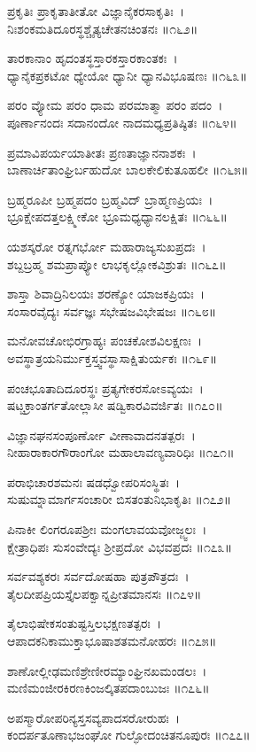 	ಪ್ರಕೃತಿಃ ಪ್ರಾಕೃತಾತೀತೋ ವಿಜ್ಞಾನೈಕರಸಾಕೃತಿಃ~।\\
	ನಿಃಶಂಕಮತಿದೂರಸ್ಥಶ್ಚೈತ್ಯಚೇತನಚಿಂತನಃ ॥೧೬೨॥

ತಾರಕಾನಾಂ ಹೃದಂತಸ್ಥಸ್ತಾರಕಸ್ತಾರಕಾಂತಕಃ~।\\
ಧ್ಯಾನೈಕಪ್ರಕಟೋ ಧ್ಯೇಯೋ ಧ್ಯಾನೀ ಧ್ಯಾನವಿಭೂಷಣಃ ॥೧೬೩॥

	ಪರಂ ವ್ಯೋಮ ಪರಂ ಧಾಮ ಪರಮಾತ್ಮಾ ಪರಂ ಪದಂ~।\\
	ಪೂರ್ಣಾನಂದಃ ಸದಾನಂದೋ ನಾದಮಧ್ಯಪ್ರತಿಷ್ಠಿತಃ ॥೧೬೪॥

ಪ್ರಮಾವಿಪರ್ಯಯಾತೀತಃ ಪ್ರಣತಾಜ್ಞಾನನಾಶಕಃ~।\\
ಬಾಣಾರ್ಚಿತಾಂಘ್ರಿರ್ಬಹುದೋ ಬಾಲಕೇಲಿಕುತೂಹಲೀ ॥೧೬೫॥

	ಬ್ರಹ್ಮರೂಪೀ ಬ್ರಹ್ಮಪದಂ ಬ್ರಹ್ಮವಿದ್ ಬ್ರಾಹ್ಮಣಪ್ರಿಯಃ~।\\
	ಭ್ರೂಕ್ಷೇಪದತ್ತಲಕ್ಷ್ಮೀಕೋ ಭ್ರೂಮಧ್ಯಧ್ಯಾನಲಕ್ಷಿತಃ ॥೧೬೬॥

ಯಶಸ್ಕರೋ ರತ್ನಗರ್ಭೋ ಮಹಾರಾಜ್ಯಸುಖಪ್ರದಃ~।\\
ಶಬ್ದಬ್ರಹ್ಮ ಶಮಪ್ರಾಪ್ಯೋ ಲಾಭಕೃಲ್ಲೋಕವಿಶ್ರುತಃ ॥೧೬೭॥

	ಶಾಸ್ತಾ ಶಿವಾದ್ರಿನಿಲಯಃ ಶರಣ್ಯೋ ಯಾಜಕಪ್ರಿಯಃ~।\\
	ಸಂಸಾರವೈದ್ಯಃ ಸರ್ವಜ್ಞಃ ಸಭೇಷಜವಿಭೇಷಜಃ ॥೧೬೮॥

ಮನೋವಚೋಭಿರಗ್ರಾಹ್ಯಃ ಪಂಚಕೋಶವಿಲಕ್ಷಣಃ~।\\
ಅವಸ್ಥಾತ್ರಯನಿರ್ಮುಕ್ತಸ್ತ್ವವಸ್ಥಾಸಾಕ್ಷಿತುರ್ಯಕಃ ॥೧೬೯॥

	ಪಂಚಭೂತಾದಿದೂರಸ್ಥಃ ಪ್ರತ್ಯಗೇಕರಸೋಽವ್ಯಯಃ~।\\
	ಷಟ್ಚಕ್ರಾಂತರ್ಗತೋಲ್ಲಾಸೀ ಷಡ್ವಿಕಾರವಿವರ್ಜಿತಃ ॥೧೭೦॥

ವಿಜ್ಞಾನಘನಸಂಪೂರ್ಣೋ ವೀಣಾವಾದನತತ್ಪರಃ~।\\
ನೀಹಾರಾಕಾರಗೌರಾಂಗೋ ಮಹಾಲಾವಣ್ಯವಾರಿಧಿಃ ॥೧೭೧॥

	ಪರಾಭಿಚಾರಶಮನಃ ಷಡಧ್ವೋಪರಿಸಂಸ್ಥಿತಃ~।\\
	ಸುಷುಮ್ನಾಮಾರ್ಗಸಂಚಾರೀ ಬಿಸತಂತುನಿಭಾಕೃತಿಃ ॥೧೭೨॥

ಪಿನಾಕೀ ಲಿಂಗರೂಪಶ್ರೀಃ ಮಂಗಲಾವಯವೋಜ್ಜ್ವಲಃ~।\\
ಕ್ಷೇತ್ರಾಧಿಪಃ ಸುಸಂವೇದ್ಯಃ ಶ್ರೀಪ್ರದೋ ವಿಭವಪ್ರದಃ ॥೧೭೩॥

	ಸರ್ವವಶ್ಯಕರಃ ಸರ್ವದೋಷಹಾ ಪುತ್ರಪೌತ್ರದಃ~।\\
	ತೈಲದೀಪಪ್ರಿಯಸ್ತೈಲಪಕ್ವಾನ್ನಪ್ರೀತಮಾನಸಃ ॥೧೭೪॥

ತೈಲಾಭಿಷೇಕಸಂತುಷ್ಟಸ್ತಿಲಭಕ್ಷಣತತ್ಪರಃ~।\\
ಆಪಾದಕನಿಕಾಮುಕ್ತಾಭೂಷಾಶತಮನೋಹರಃ ॥೧೭೫॥

	ಶಾಣೋಲ್ಲೀಢಮಣಿಶ್ರೇಣೀರಮ್ಯಾಂಘ್ರಿನಖಮಂಡಲಃ~।\\
	ಮಣಿಮಂಜೀರಕಿರಣಕಿಂಜಲ್ಕಿತಪದಾಂಬುಜಃ ॥೧೭೬॥

ಅಪಸ್ಮಾರೋಪರಿನ್ಯಸ್ತಸವ್ಯಪಾದಸರೋರುಹಃ~।\\
ಕಂದರ್ಪತೂಣಾಭಜಂಘೋ ಗುಲ್ಫೋದಂಚಿತನೂಪುರಃ ॥೧೭೭॥

